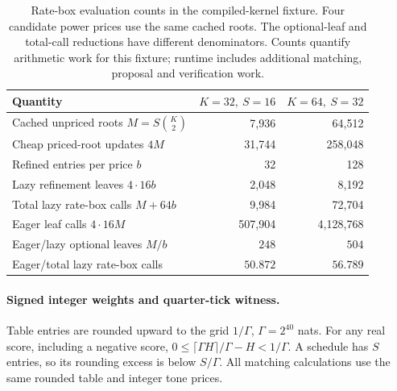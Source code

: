 \begin{table}[htbp]
\centering
\small
\caption{Rate-box evaluation counts in the compiled-kernel fixture. Four candidate power prices use the same cached roots. The optional-leaf and total-call reductions have different denominators. Counts quantify arithmetic work for this fixture; runtime includes additional matching, proposal and verification work.}
\label{supp:table2}
\begin{tabular}{lrr}
\hline
Quantity & \(K=32,\ S=16\) & \(K=64,\ S=32\)\\
\hline
Cached unpriced roots \(M=S\binom K2\) & 7,936 & 64,512\\
Cheap priced-root updates \(4M\) & 31,744 & 258,048\\
Refined entries per price \(b\) & 32 & 128\\
Lazy refinement leaves \(4\cdot16b\) & 2,048 & 8,192\\
Total lazy rate-box calls \(M+64b\) & 9,984 & 72,704\\
Eager leaf calls \(4\cdot16M\) & 507,904 & 4,128,768\\
Eager/lazy optional leaves \(M/b\) & \(248\) & \(504\)\\
Eager/total lazy rate-box calls & \(50.872\) & \(56.789\)\\
\hline
\end{tabular}
\end{table}

\paragraph{Signed integer weights and quarter-tick witness.}
Table entries are rounded upward to the grid \(1/\Gamma\), \(\Gamma=2^{40}\) nats. For any real score, including a negative score,
\(0\leq\lceil\Gamma H\rceil/\Gamma-H<1/\Gamma\). A schedule has \(S\) entries, so its rounding excess is below \(S/\Gamma\). All matching calculations use the same rounded table and integer tone prices.


